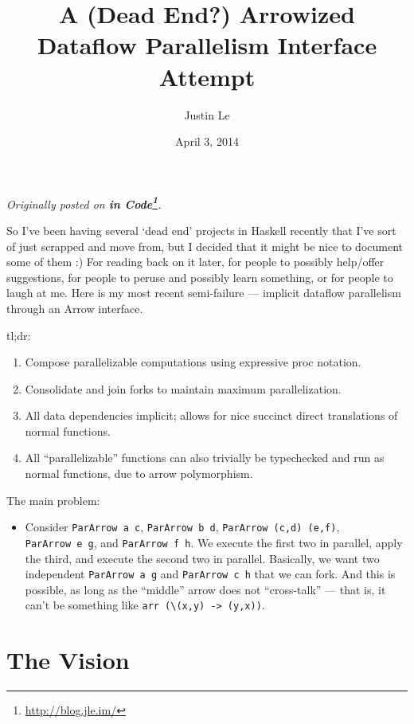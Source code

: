 \documentclass[]{article}
\title{A (Dead End?) Arrowized Dataflow Parallelism Interface Attempt}
\author{Justin Le}
\date{April 3, 2014}
\renewcommand{\href}[2]{#2\footnote{\url{#1}}}
\begin{document}
\maketitle

\emph{Originally posted on \textbf{\href{http://blog.jle.im/}{in
Code}}.}

So I've been having several `dead end' projects in Haskell recently that
I've sort of just scrapped and move from, but I decided that it might be
nice to document some of them :) For reading back on it later, for
people to possibly help/offer suggestions, for people to peruse and
possibly learn something, or for people to laugh at me. Here is my most
recent semi-failure --- implicit dataflow parallelism through an Arrow
interface.

tl;dr:

\begin{enumerate}
\def\labelenumi{\arabic{enumi}.}
\tightlist
\item
  Compose parallelizable computations using expressive proc notation.
\item
  Consolidate and join forks to maintain maximum parallelization.
\item
  All data dependencies implicit; allows for nice succinct direct
  translations of normal functions.
\item
  All ``parallelizable'' functions can also trivially be typechecked and
  run as normal functions, due to arrow polymorphism.
\end{enumerate}

The main problem:

\begin{itemize}
\tightlist
\item
  Consider \texttt{ParArrow\ a\ c}, \texttt{ParArrow\ b\ d},
  \texttt{ParArrow\ (c,d)\ (e,f)}, \texttt{ParArrow\ e\ g}, and
  \texttt{ParArrow\ f\ h}. We execute the first two in parallel, apply
  the third, and execute the second two in parallel. Basically, we want
  two independent \texttt{ParArrow\ a\ g} and \texttt{ParArrow\ c\ h}
  that we can fork. And this is possible, as long as the ``middle''
  arrow does not ``cross-talk'' --- that is, it can't be something like
  \texttt{arr\ (\textbackslash{}(x,y)\ -\textgreater{}\ (y,x))}.
\end{itemize}

\section{The Vision}\label{the-vision}
\end{document}

